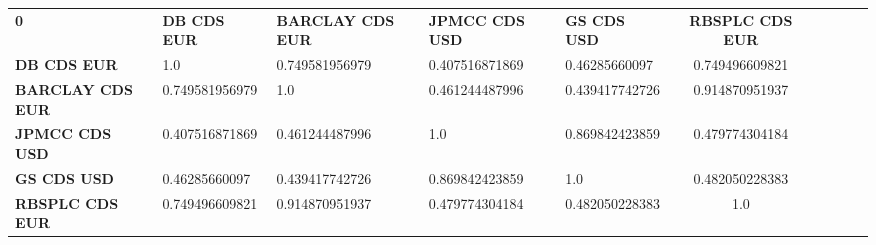\begin{center}
 \begin{tabular}{|l|l|l|l|l|c|c|c|c|c|}
\hline
\textbf{0} & \textbf{DB CDS EUR} & \textbf{BARCLAY CDS EUR} & \textbf{JPMCC CDS USD} & \textbf{GS CDS USD} & \textbf{RBSPLC CDS EUR}\\\hhline{|=|=|=|=|=|=|}
\textbf{DB CDS EUR} & 1.0 & 0.749581956979 & 0.407516871869 & 0.46285660097 & 0.749496609821\\
\textbf{BARCLAY CDS EUR} & 0.749581956979 & 1.0 & 0.461244487996 & 0.439417742726 & 0.914870951937\\
\textbf{JPMCC CDS USD} & 0.407516871869 & 0.461244487996 & 1.0 & 0.869842423859 & 0.479774304184\\
\textbf{GS CDS USD} & 0.46285660097 & 0.439417742726 & 0.869842423859 & 1.0 & 0.482050228383\\
\textbf{RBSPLC CDS EUR} & 0.749496609821 & 0.914870951937 & 0.479774304184 & 0.482050228383 & 1.0\\
\hline
\end{tabular}
\end{center}